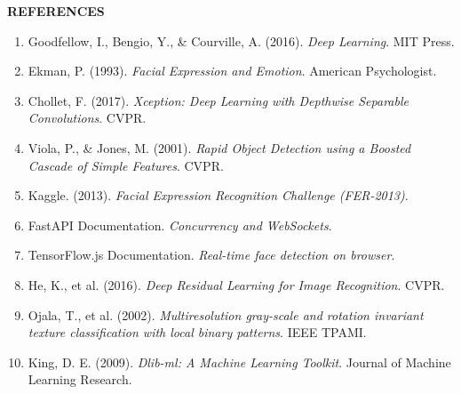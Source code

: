 \documentclass[12pt,a4paper]{report}
\begin{document}
\clearpage

\begin{center}
{\Huge\bfseries REFERENCES}
\end{center}
\vspace{1cm}

\begin{enumerate}
    \item Goodfellow, I., Bengio, Y., \& Courville, A. (2016). \textit{Deep Learning}. MIT Press.
    \item Ekman, P. (1993). \textit{Facial Expression and Emotion}. American Psychologist.
    \item Chollet, F. (2017). \textit{Xception: Deep Learning with Depthwise Separable Convolutions}. CVPR.
    \item Viola, P., \& Jones, M. (2001). \textit{Rapid Object Detection using a Boosted Cascade of Simple Features}. CVPR.
    \item Kaggle. (2013). \textit{Facial Expression Recognition Challenge (FER-2013)}.
    \item FastAPI Documentation. \textit{Concurrency and WebSockets}.
    \item TensorFlow.js Documentation. \textit{Real-time face detection on browser}.
    \item He, K., et al. (2016). \textit{Deep Residual Learning for Image Recognition}. CVPR.
    \item Ojala, T., et al. (2002). \textit{Multiresolution gray-scale and rotation invariant texture classification with local binary patterns}. IEEE TPAMI.
    \item King, D. E. (2009). \textit{Dlib-ml: A Machine Learning Toolkit}. Journal of Machine Learning Research.
\end{enumerate}
\end{document}
